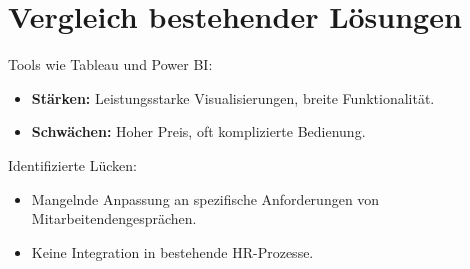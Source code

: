 \section{Vergleich bestehender Lösungen}
Tools wie Tableau und Power BI:
\begin{itemize}
    \item \textbf{Stärken:} Leistungsstarke Visualisierungen, breite Funktionalität.
    \item \textbf{Schwächen:} Hoher Preis, oft komplizierte Bedienung.
\end{itemize}

Identifizierte Lücken:
\begin{itemize}
    \item Mangelnde Anpassung an spezifische Anforderungen von Mitarbeitendengesprächen.
    \item Keine Integration in bestehende HR-Prozesse.
\end{itemize}